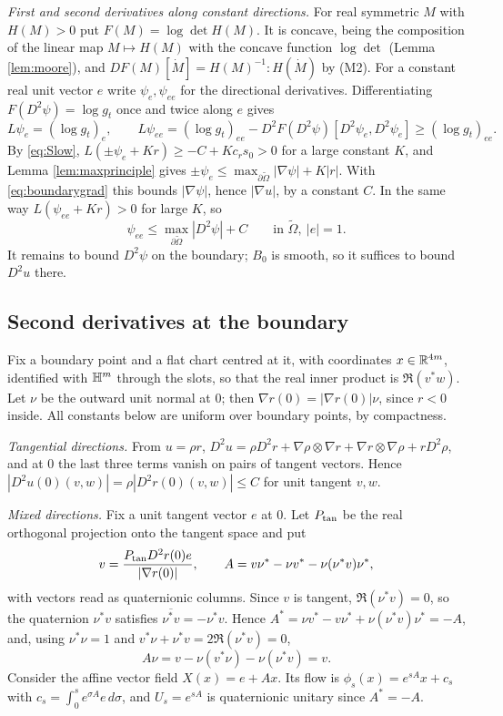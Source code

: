 \emph{First and second derivatives along constant directions.} For real symmetric $M$ with $H(M)>0$
put $F(M)=\log\det H(M)$. It is concave, being the composition of the linear map $M\mapsto H(M)$ with
the concave function $\log\det$ (Lemma \ref{lem:moore}), and $DF(M)[\dot M]=H(M)^{-1}:H(\dot M)$ by
(M2). For a constant real unit vector $e$ write $\psi_e,\psi_{ee}$ for the directional derivatives.
Differentiating $F(D^2\psi)=\log g_t$ once and twice along $e$ gives
\begin{equation}\label{eq:diffeq}
L\psi_e=(\log g_t)_e,\qquad L\psi_{ee}=(\log g_t)_{ee}-D^2F(D^2\psi)[D^2\psi_e,D^2\psi_e]\ge(\log g_t)_{ee}.
\end{equation}
By \eqref{eq:Slow}, $L(\pm\psi_e+Kr)\ge-C+Kc_rs_0>0$ for a large constant $K$, and Lemma
\ref{lem:maxprinciple} gives $\pm\psi_e\le\max_{\partial\tilde\Omega}|\nabla\psi|+K|r|$. With
\eqref{eq:boundarygrad} this bounds $|\nabla\psi|$, hence $|\nabla u|$, by a constant $C$. In the same
way $L(\psi_{ee}+Kr)>0$ for large $K$, so
\begin{equation}\label{eq:hessreduce}
\psi_{ee}\le\max_{\partial\tilde\Omega}|D^2\psi|+C\qquad\text{in }\tilde\Omega,\ |e|=1 .
\end{equation}
It remains to bound $D^2\psi$ on the boundary; $B_0$ is smooth, so it suffices to bound $D^2u$ there.

\subsection{Second derivatives at the boundary}
Fix a boundary point and a flat chart centred at it, with coordinates $x\in\mathbb{R}^{4m}$, identified with
$\mathbb{H}^m$ through the slots, so that the real inner product is $\Re(v^*w)$. Let $\nu$ be the outward unit
normal at $0$; then $\nabla r(0)=|\nabla r(0)|\nu$, since $r<0$ inside. All constants below are uniform
over boundary points, by compactness.

\emph{Tangential directions.} From $u=\rho r$,
$D^2u=\rho D^2r+\nabla\rho\otimes\nabla r+\nabla r\otimes\nabla\rho+rD^2\rho$, and at $0$ the last three terms
vanish on pairs of tangent vectors. Hence $|D^2u(0)(v,w)|=\rho|D^2r(0)(v,w)|\le C$ for unit tangent
$v,w$.

\emph{Mixed directions.} Fix a unit tangent vector $e$ at $0$. Let $P_{\rm tan}$ be the real orthogonal
projection onto the tangent space and put
\[
v=\frac{P_{\rm tan}D^2r(0)e}{|\nabla r(0)|},\qquad A=v\nu^*-\nu v^*-\nu(\nu^*v)\nu^* ,
\]
with vectors read as quaternionic columns. Since $v$ is tangent, $\Re(\nu^*v)=0$, so the quaternion
$\nu^*v$ satisfies $\overline{\nu^*v}=-\nu^*v$. Hence
$A^*=\nu v^*-v\nu^*+\nu(\nu^*v)\nu^*=-A$, and, using $\nu^*\nu=1$ and $v^*\nu+\nu^*v=2\Re(\nu^*v)=0$,
\[
A\nu=v-\nu(v^*\nu)-\nu(\nu^*v)=v .
\]
Consider the affine vector field $X(x)=e+Ax$. Its flow is $\phi_s(x)=e^{sA}x+c_s$ with
$c_s=\int_0^se^{\sigma A}e\,d\sigma$, and $U_s=e^{sA}$ is quaternionic unitary since $A^*=-A$.

